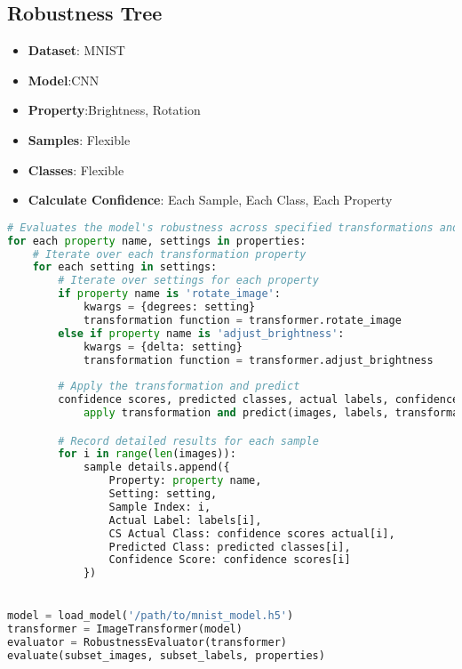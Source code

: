 \documentclass{article}
\begin{document}
\subsection{Robustness Tree}
\begin{itemize}
    \item \textbf{Dataset}: MNIST
    \item \textbf{Model}:CNN
     \item \textbf{Property}:Brightness, Rotation
    \item \textbf{Samples}: Flexible
    \item \textbf{Classes}: Flexible
     \item \textbf{Calculate Confidence}: Each Sample, Each Class, Each Property
\end{itemize}



\begin{lstlisting}[language=python, caption=Evaluate Robustness of System]
# Evaluates the model's robustness across specified transformations and settings
for each property name, settings in properties:
    # Iterate over each transformation property
    for each setting in settings:
        # Iterate over settings for each property
        if property name is 'rotate_image':
            kwargs = {degrees: setting}
            transformation function = transformer.rotate_image
        else if property name is 'adjust_brightness':
            kwargs = {delta: setting}
            transformation function = transformer.adjust_brightness
   
        # Apply the transformation and predict
        confidence scores, predicted classes, actual labels, confidence scores actual =
            apply transformation and predict(images, labels, transformation function, kwargs)

        # Record detailed results for each sample
        for i in range(len(images)):
            sample details.append({
                Property: property name,
                Setting: setting,
                Sample Index: i,
                Actual Label: labels[i],
                CS Actual Class: confidence scores actual[i],
                Predicted Class: predicted classes[i],
                Confidence Score: confidence scores[i]
            })


model = load_model('/path/to/mnist_model.h5')
transformer = ImageTransformer(model)
evaluator = RobustnessEvaluator(transformer)
evaluate(subset_images, subset_labels, properties)
\end{lstlisting}
\end{document}
